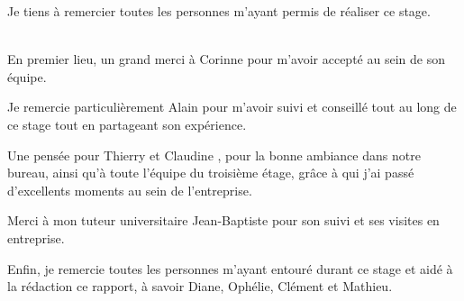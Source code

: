 Je tiens à remercier toutes les personnes m'ayant permis de réaliser ce stage.\\~

En premier lieu, un grand merci à Corinne  pour m'avoir accepté au sein de son équipe.

Je remercie particulièrement Alain  pour m'avoir suivi et conseillé tout au long de ce stage tout en partageant son expérience.

Une pensée pour Thierry  et Claudine , pour la bonne ambiance dans notre bureau, ainsi qu'à toute l'équipe du troisième étage, grâce à qui j'ai passé d'excellents moments au sein de l'entreprise.

Merci à mon tuteur universitaire Jean-Baptiste  pour son suivi et ses visites en entreprise.

Enfin, je remercie toutes les personnes m'ayant entouré durant ce stage et aidé à la rédaction ce rapport, à savoir Diane, Ophélie, Clément et Mathieu.
